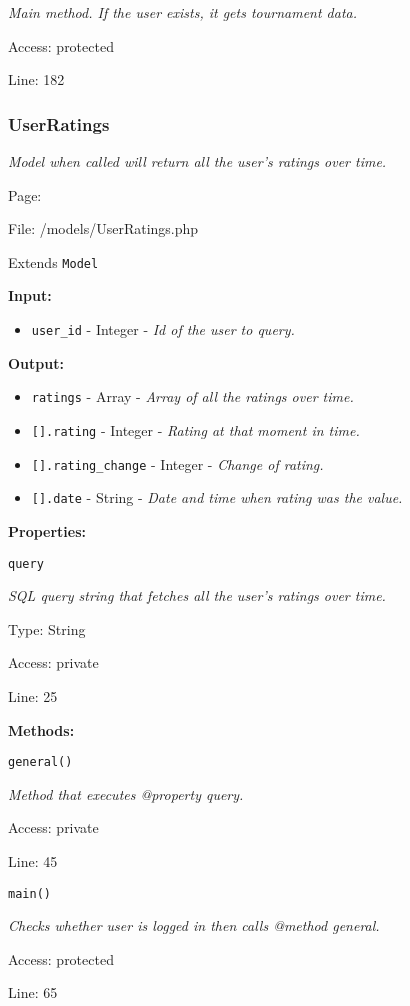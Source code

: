 {\scriptsize
\textit{Main method.
If the user exists, it gets tournament data.}

Access: protected

Line: 182

}

\subsubsection{UserRatings}\label{UserRatings.php.doc}
\textit{Model when called will return all the user's ratings over time.}

Page: \pageref{UserRatings.php}

File: /models/UserRatings.php

Extends \texttt{Model}

\textbf{Input:}
\begin{itemize}
\item \texttt{user\_id} - Integer - \textit{Id of the user to query.}
\end{itemize}

\textbf{Output:}
\begin{itemize}
\item \texttt{ratings} - Array - \textit{Array of all the ratings over time.}
\item \texttt{[].rating} - Integer - \textit{Rating at that moment in time.}
\item \texttt{[].rating\_change} - Integer - \textit{Change of rating.}
\item \texttt{[].date} - String - \textit{Date and time when rating was the value.}
\end{itemize}

\textbf{Properties:}

\texttt{query}

{\scriptsize
\textit{SQL query string that fetches all the user's ratings over time.}

Type: String

Access: private

Line: 25

}
\textbf{Methods:}

\texttt{general()}

{\scriptsize
\textit{Method that executes @property query.}

Access: private

Line: 45

}

\texttt{main()}

{\scriptsize
\textit{Checks whether user is logged in then calls @method general.}

Access: protected

Line: 65

}

